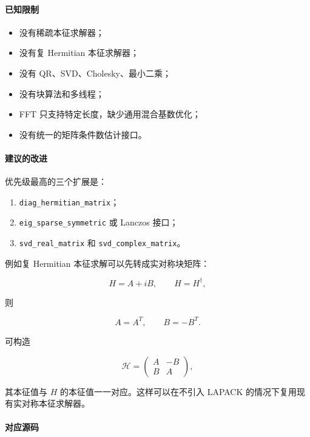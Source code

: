 \documentclass[
]{ctexbook}
\providecommand{\tightlist}{%
  \setlength{\itemsep}{0pt}\setlength{\parskip}{0pt}}
\begin{document}
\hypertarget{ux5df2ux77e5ux9650ux5236-2}{%
\paragraph{已知限制}\label{ux5df2ux77e5ux9650ux5236-2}}

\begin{itemize}
\tightlist
\item
  没有稀疏本征求解器；
\item
  没有复 Hermitian 本征求解器；
\item
  没有 QR、SVD、Cholesky、最小二乘；
\item
  没有块算法和多线程；
\item
  FFT 只支持特定长度，缺少通用混合基数优化；
\item
  没有统一的矩阵条件数估计接口。
\end{itemize}

\hypertarget{ux5efaux8baeux7684ux6539ux8fdb-2}{%
\paragraph{建议的改进}\label{ux5efaux8baeux7684ux6539ux8fdb-2}}

优先级最高的三个扩展是：

\begin{enumerate}
\def\labelenumi{\arabic{enumi}.}
\tightlist
\item
  \texttt{diag\_hermitian\_matrix}；
\item
  \texttt{eig\_sparse\_symmetric} 或 Lanczos 接口；
\item
  \texttt{svd\_real\_matrix} 和 \texttt{svd\_complex\_matrix}。
\end{enumerate}

例如复 Hermitian 本征求解可以先转成实对称块矩阵：

\[
H=A+iB,\qquad H=H^{\dagger},
\]

则

\[
A=A^T,\qquad B=-B^T.
\]

可构造

\[
\mathcal H
=
\begin{pmatrix}
A & -B\\
B & A
\end{pmatrix},
\]

其本征值与 \(H\) 的本征值一一对应。这样可以在不引入 LAPACK
的情况下复用现有实对称本征求解器。

\hypertarget{ux5bf9ux5e94ux6e90ux7801-68}{%
\paragraph{对应源码}\label{ux5bf9ux5e94ux6e90ux7801-68}}
\end{document}
